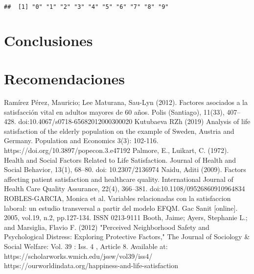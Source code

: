 \documentclass[
]{article}
\newenvironment{Shaded}{\begin{snugshade}}{\end{snugshade}}
\newcommand{\FunctionTok}[1]{\textcolor[rgb]{0.00,0.00,0.00}{#1}}
\newcommand{\NormalTok}[1]{#1}
\newcommand{\SpecialCharTok}[1]{\textcolor[rgb]{0.00,0.00,0.00}{#1}}
\begin{document}
\begin{Shaded}
\end{Shaded}

\begin{verbatim}
##  [1] "0" "1" "2" "3" "4" "5" "6" "7" "8" "9"
\end{verbatim}

\hypertarget{conclusiones}{%
\section{Conclusiones}\label{conclusiones}}

\hypertarget{recomendaciones}{%
\section{Recomendaciones}\label{recomendaciones}}

\begin{thebibliography}{X}
Ramírez Pérez, Mauricio; Lee Maturana, Sau-Lyn (2012). Factores asociados a la satisfacción vital en adultos mayores de 60 años. Polis (Santiago), 11(33), 407–428. doi:10.4067/s0718-65682012000300020
Kutubaeva RZh (2019) Analysis of life satisfaction of the elderly population on the example of Sweden, Austria and Germany. Population and Economics 3(3): 102-116. https://doi.org/10.3897/popecon.3.e47192
Palmore, E., Luikart, C. (1972). Health and Social Factors Related to Life Satisfaction. Journal of Health and Social Behavior, 13(1), 68–80. doi: 10.2307/2136974
Naidu, Aditi (2009). Factors affecting patient satisfaction and healthcare quality. International Journal of Health Care Quality Assurance, 22(4), 366–381. doi:10.1108/09526860910964834 
ROBLES-GARCIA, Monica et al. Variables relacionadas con la satisfaccion laboral: un estudio transversal a partir del modelo EFQM. Gac Sanit [online]. 2005, vol.19, n.2, pp.127-134. ISSN 0213-9111
Booth, Jaime; Ayers, Stephanie L.; and Marsiglia, Flavio F. (2012) "Perceived Neighborhood Safety and Psychological Distress: Exploring Protective Factors," The Journal of Sociology \& Social Welfare: Vol. 39 : Iss. 4 , Article 8. Available at: https://scholarworks.wmich.edu/jssw/vol39/iss4/
https://ourworldindata.org/happiness-and-life-satisfaction
\end{thebibliography}
\end{document}
